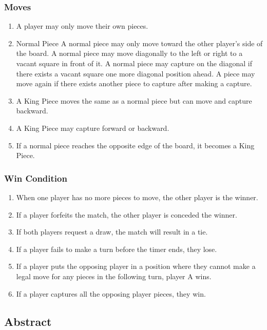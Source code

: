 \documentclass[10pt]{article}
\begin{document}
\subsubsection{Moves} 
\begin{enumerate}
    \item A player may only move their own pieces.
    \item Normal Piece
        \subitem A normal piece may only move toward the other player's side of the board.
        \subitem A normal piece may move diagonally to the left or right to a vacant square in front of it.
        \subitem A normal piece may capture on the diagonal if there exists a vacant square one more diagonal position ahead.
            \subsubitem A piece may move again if there exists another piece to capture after making a capture.
    \item A King Piece moves the same as a normal piece but can move and capture backward.
    \item A King Piece may capture forward or backward.
    \item If a normal piece reaches the opposite edge of the board, it becomes a King Piece.
\end{enumerate}   

\subsubsection{Win Condition}
\begin{enumerate}
    \item When one player has no more pieces to move, the other player is the winner.
    \item If a player forfeits the match, the other player is conceded the winner.
    \item If both players request a draw, the match will result in a tie.
    \item If a player fails to make a turn before the timer ends, they lose.
    \item If a player puts the opposing player in a position where they cannot make a legal move for any pieces in the following turn, player A wins.
    \item If a player captures all the opposing player pieces, they win.
\end{enumerate}

\subsection{Abstract}
\end{document}
